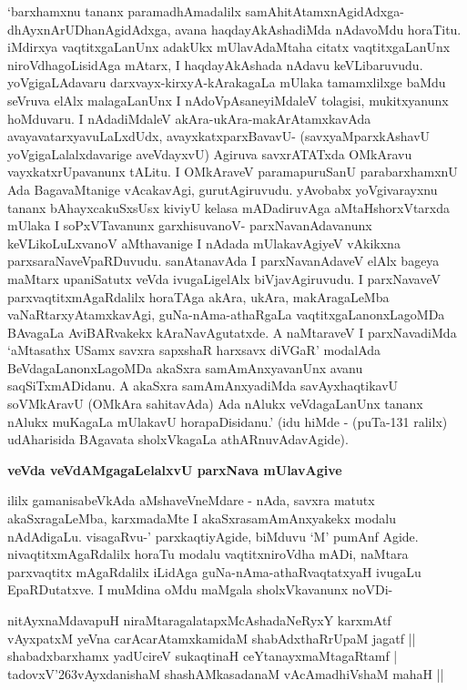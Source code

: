 \noindent
`barxhamxnu tananx paramadhAmadalilx samAhitAtamxnAgidAdxga- dhAyxnArUDhanAgidAdxga, avana haqdayAkAshadiMda nAdavoMdu horaTitu. iMdirxya vaqtitxgaLanUnx adakUkx mUlavAdaMtaha citatx vaqtitxgaLanUnx niroVdhagoLisidAga mAtarx, I haqdayAkAshada nAdavu keVLibaruvudu. yoVgigaLAdavaru darxvayx-kirxyA-kArakagaLa mUlaka tamamxlilxge baMdu seVruva elAlx malagaLanUnx I nAdoVpAsaneyiMdaleV tolagisi, mukitxyanunx hoMduvaru. I nAdadiMdaleV akAra-ukAra-makArAtamxkavAda avayavatarxyavuLaLxdUdx, avayxkatxparxBavavU- (savxyaMparxkAshavU yoVgigaLalalxdavarige aveVdayxvU) Agiruva savxrATATxda OMkAravu vayxkatxrUpavanunx tALitu. I OMkAraveV paramapuruSanU parabarxhamxnU Ada BagavaMtanige vAcakavAgi, gurutAgiruvudu. yAvobabx yoVgivarayxnu tananx bAhayxcakuSxsUsx kiviyU kelasa mADadiruvAga aMtaHshorxVtarxda mUlaka I soPxVTavanunx garxhisuvanoV- parxNavanAdavanunx keVLikoLuLxvanoV aMthavanige I nAdada mUlakavAgiyeV vAkikxna parxsaraNaveVpaRDuvudu. sanAtanavAda I parxNavanAdaveV elAlx bageya maMtarx upaniSatutx veVda ivugaLigelAlx biVjavAgiruvudu. I parxNavaveV parxvaqtitxmAgaRdalilx horaTAga akAra, ukAra, makAragaLeMba vaNaRtarxyAtamxkavAgi, guNa-nAma-athaRgaLa vaqtitxgaLanonxLagoMDa BAvagaLa AviBARvakekx kAraNavAgutatxde. A naMtaraveV I parxNavadiMda `aMtasathx USamx savxra sapxshaR harxsavx diVGaR' modalAda BeVdagaLanonxLagoMDa akaSxra samAmAnxyavanUnx avanu saqSiTxmADidanu. A akaSxra samAmAnxyadiMda savAyxhaqtikavU soVMkAravU (OMkAra sahitavAda) Ada nAlukx veVdagaLanUnx tananx nAlukx muKagaLa mUlakavU horapaDisidanu.' (idu hiMde - (puTa-131 ralilx) udAharisida BAgavata sholxVkagaLa athARnuvAdavAgide).

{\bigskip
\noindent
{\large\bf veVda veVdAMgagaLelalxvU parxNava mUlavAgive}}\label{page165}
\medskip

\noindent
ililx gamanisabeVkAda aMshaveVneMdare - nAda, savxra matutx akaSxragaLeMba, karxmadaMte I akaSxrasamAmAnxyakekx modalu nAdAdigaLu. visagaRvu-' parxkaqtiyAgide, biMduvu `M' pumAnf Agide. nivaqtitxmAgaRdalilx horaTu modalu vaqtitxniroVdha mADi, naMtara parxvaqtitx mAgaRdalilx iLidAga guNa-nAma-athaRvaqtatxyaH ivugaLu EpaRDutatxve. I muMdina oMdu maMgala sholxVkavanunx noVDi-

\begin{shloka}
nitAyxnaMdavapuH niraMtaragalatapxMcAshadaNeRyxY karxmAtf\\\label{165}
vAyxpatxM yeVna carAcarAtamxkamidaM shabAdxthaRrUpaM jagatf ||\\
shabadxbarxhamx yadUcireV sukaqtinaH ceYtanayxmaMtagaRtamf |\\
tadovxV\char'263vAyxdanishaM shashAMkasadanaM vAcAmadhiVshaM mahaH ||
\end{shloka}

